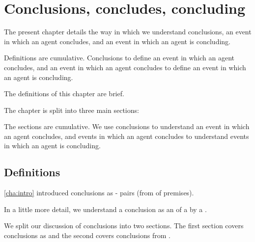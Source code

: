 \chapter{Conclusions, concludes, concluding}
\label{cha:clar}

\begin{note}
  The present chapter details the way in which we understand conclusions, an event in which an agent concludes, and an event in which an agent is concluding.

  Definitions are cumulative.
  Conclusions to define an event in which an agent concludes, and an event in which an agent concludes to define an event in which an agent is concluding.

  The definitions of this chapter are brief.

  The chapter is split into three main sections:





  The sections are cumulative.
  We use conclusions to understand an event in which an agent concludes, and events in which an agent concludes to understand events in which an agent is concluding.
\end{note}

\section{Definitions}
\label{cha:clar:sec:Cons}

\begin{note}
  \autoref{cha:intro} introduced conclusions as - pairs (from  of premises).

  In a little more detail, we understand a conclusion as an \eval{} of a  by a .
  

  We split our discussion of conclusions into two sections.
  The first section covers conclusions as  and the second covers conclusions from .
\end{note}

